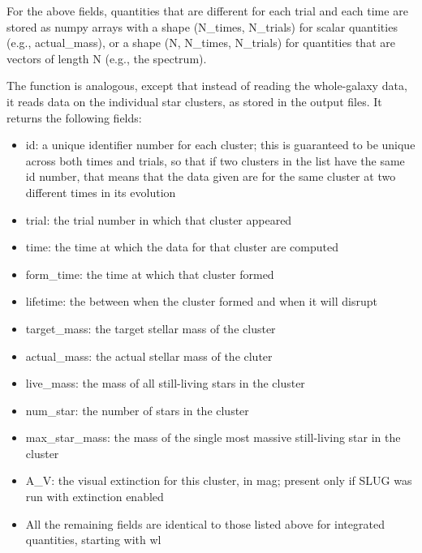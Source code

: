 \documentclass[letterpaper,10pt,english]{sphinxmanual}
\begin{document}
For the above fields, quantities that are different for each trial and each time are stored as numpy arrays with a shape (N\_times, N\_trials) for scalar quantities (e.g., actual\_mass), or a shape (N, N\_times, N\_trials) for quantities that are vectors of length N (e.g., the spectrum).

The  function is analogous, except that instead of reading the whole-galaxy data, it reads data on the individual star clusters, as stored in the  output files. It returns the following fields:
\begin{itemize}
\item {} 
id: a unique identifier number for each cluster; this is guaranteed to be unique across both times and trials, so that if two clusters in the list have the same id number, that means that the data given are for the same cluster at two different times in its evolution

\item {} 
trial: the trial number in which that cluster appeared

\item {} 
time: the time at which the data for that cluster are computed

\item {} 
form\_time: the time at which that cluster formed

\item {} 
lifetime: the between when the cluster formed and when it will disrupt

\item {} 
target\_mass: the target stellar mass of the cluster

\item {} 
actual\_mass: the actual stellar mass of the cluter

\item {} 
live\_mass: the mass of all still-living stars in the cluster

\item {} 
num\_star: the number of stars in the cluster

\item {} 
max\_star\_mass: the mass of the single most massive still-living star in the cluster

\item {} 
A\_V: the visual extinction for this cluster, in mag; present only if SLUG was run with extinction enabled

\item {} 
All the remaining fields are identical to those listed above for integrated quantities, starting with wl

\end{itemize}
\end{document}
